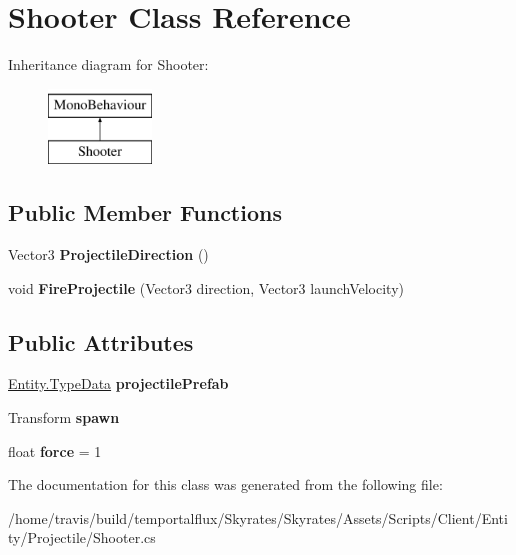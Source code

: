 \hypertarget{class_shooter}{\section{Shooter Class Reference}
\label{class_shooter}
}
Inheritance diagram for Shooter\-:\begin{figure}[H]
\begin{center}
\leavevmode
\includegraphics[height=2.000000cm]{class_shooter}
\end{center}
\end{figure}
\subsection*{Public Member Functions}
\begin{DoxyCompactItemize}
\item 
\hypertarget{class_shooter_a5e89d1344171a30cccc7b0e22f2e26e5}{Vector3 {\bfseries Projectile\-Direction} ()}\label{class_shooter_a5e89d1344171a30cccc7b0e22f2e26e5}

\item 
\hypertarget{class_shooter_a8f6d6c78a0579a73a8833a09b2302996}{void {\bfseries Fire\-Projectile} (Vector3 direction, Vector3 launch\-Velocity)}\label{class_shooter_a8f6d6c78a0579a73a8833a09b2302996}

\end{DoxyCompactItemize}
\subsection*{Public Attributes}
\begin{DoxyCompactItemize}
\item 
\hypertarget{class_shooter_a05fcdc1550191f05db13ebe9405c0b7b}{\hyperlink{class_skyrates_1_1_common_1_1_entity_1_1_entity_1_1_type_data}{Entity.\-Type\-Data} {\bfseries projectile\-Prefab}}\label{class_shooter_a05fcdc1550191f05db13ebe9405c0b7b}

\item 
\hypertarget{class_shooter_a2ace09fc935b67cad5592a578516ec03}{Transform {\bfseries spawn}}\label{class_shooter_a2ace09fc935b67cad5592a578516ec03}

\item 
\hypertarget{class_shooter_ade2928b5b4ff8b037913d71f312cbc38}{float {\bfseries force} = 1}\label{class_shooter_ade2928b5b4ff8b037913d71f312cbc38}

\end{DoxyCompactItemize}


The documentation for this class was generated from the following file\-:\begin{DoxyCompactItemize}
\item 
/home/travis/build/temportalflux/\-Skyrates/\-Skyrates/\-Assets/\-Scripts/\-Client/\-Entity/\-Projectile/Shooter.\-cs\end{DoxyCompactItemize}
